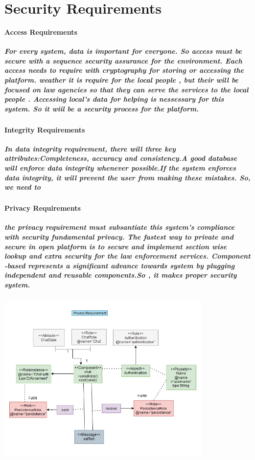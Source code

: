 \documentclass{article}
\begin{document}
\section{Security Requirements}
\paragraph{Access Requirements}
\subparagraph{For every system, data is important for everyone. So access must be secure with a sequence security assurance for the environment.
Each access needs to require with cryptography for storing or accessing the platform. weather it is require for the local people , but their will be focused on law agencies so that they can serve the services
to the local people . Accessing local's data for helping is nessessary for this system. So it wiil be a security process for the platform.
}
\paragraph{Integrity Requirements}
\subparagraph{In data integrity requirement, there will three key attributes:Completeness, accuracy and consistency.A good database will enforce data integrity whenever possible.If the system enforces data integrity, it will prevent the user from making these mistakes.
So, we need to }
\paragraph{Privacy Requirements}
\subparagraph{the privacy requirement must subsantiate this system's compliance with security fundamental privacy.
The fastest way to private and secure in open platform is to secure and implement section wise lookup and extra security for the law enforcement services.
Component -based represents a significant advance towards system by plugging independent and reusable components.So , it makes proper security system.}
\includegraphics[width=0.8\textwidth]{Privacy_Requirement.png}
\end{document}
